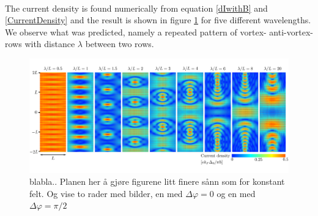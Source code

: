 \\
The current density is found numerically from equation \eqref{dIwithB} and \eqref{CurrentDensity} and the result is shown in figure \ref{fig:dist2_0} for five different wavelengths. We observe what was predicted, namely a repeated pattern of vortex- anti-vortex-rows with distance $\lambda$ between two rows.
\begin{figure}[hhh]
\centering
\includegraphics[width=17cm,clip=true,trim = 0cm 1.5cm 0cm 1cm]{fig/dist2_0}
\caption{blabla.. Planen her å gjøre figurene litt finere sånn som for konstant felt. Og vise to rader med bilder, en med $\Delta \varphi = 0$ og en med $\Delta \varphi = \pi/2$}
\label{fig:dist2_0}
\end{figure}
\\

